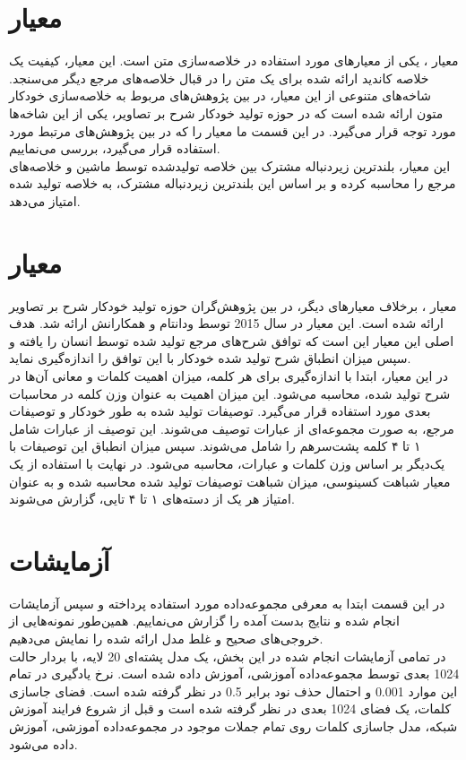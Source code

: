 \section{معیار \cite{lin2004rouge}}
معیار  ، یکی از معیارهای مورد استفاده در خلاصه‌سازی متن است. این معیار، کیفیت یک خلاصه کاندید ارائه شده برای یک متن را در قبال خلاصه‌های مرجع دیگر می‌سنجد. شاخه‌های متنوعی از این معیار، در بین پژوهش‌های مربوط به خلاصه‌سازی خودکار متون ارائه شده است که در حوزه تولید خودکار شرح بر تصاویر، یکی از این شاخه‌ها مورد توجه قرار می‌گیرد. در این قسمت ما معیار  را که در بین پژوهش‌های مرتبط مورد استفاده قرار می‌گیرد، بررسی می‌نماییم.
\\
این معیار، بلندترین زیردنباله مشترک بین خلاصه تولیدشده توسط ماشین و خلاصه‌های مرجع را محاسبه کرده و بر اساس این بلندترین زیردنباله مشترک، به خلاصه تولید شده امتیاز می‌دهد. 

\section{معیار \cite{vedantam2015cider}}
معیار 
،
برخلاف معیارهای دیگر، در بین پژوهش‌گران حوزه تولید خودکار شرح بر تصاویر ارائه شده است. این معیار در سال 2015 توسط ودانتام و همکارانش ارائه شد. هدف اصلی این معیار این است که توافق شرح‌های مرجع تولید شده توسط انسان را یافته و سپس میزان انطباق شرح تولید شده خودکار با این توافق را اندازه‌گیری نماید.
\\
در این معیار، ابتدا با اندازه‌گیری  برای هر کلمه، میزان اهمیت کلمات و معانی آن‌ها در شرح تولید شده، محاسبه می‌شود. این میزان اهمیت به عنوان وزن کلمه در محاسبات بعدی مورد استفاده قرار می‌گیرد. توصیفات تولید شده به طور خودکار و توصیفات مرجع،‌ به صورت مجموعه‌ای از عبارات  توصیف می‌شوند. این توصیف از عبارات شامل ۱ تا ۴ کلمه پشت‌سرهم را شامل می‌شوند. سپس میزان انطباق این توصیفات با یک‌دیگر بر اساس وزن کلمات و عبارات، محاسبه می‌شود. در نهایت با استفاده از یک معیار شباهت کسینوسی، میزان شباهت توصیفات تولید شده محاسبه شده و به عنوان امتیاز هر یک از دسته‌های ۱ تا ۴ تایی، گزارش می‌شوند.
\section{آزمایشات}
در این قسمت ابتدا به معرفی مجموعه‌داده مورد استفاده پرداخته و سپس آزمایشات انجام شده و نتایج بدست آمده را گزارش می‌نماییم. همین‌طور نمونه‌هایی از خروجی‌های صحیح و غلط مدل ارائه شده را نمایش می‌دهیم.
\\
در تمامی آزمایشات انجام شده در این بخش، یک مدل پشته‌ای 20 لایه، با بردار حالت 1024 بعدی توسط مجموعه‌داده آموزشی، آموزش داده شده است. نرخ یادگیری در تمام این موارد 0.001 و احتمال حذف نود برابر 0.5 در نظر گرفته شده است. فضای جاسازی کلمات، یک فضای 1024 بعدی در نظر گرفته شده است و قبل از شروع فرایند آموزش شبکه، مدل جاسازی کلمات روی تمام جملات موجود در مجموعه‌داده آموزشی، آموزش داده می‌شود.

